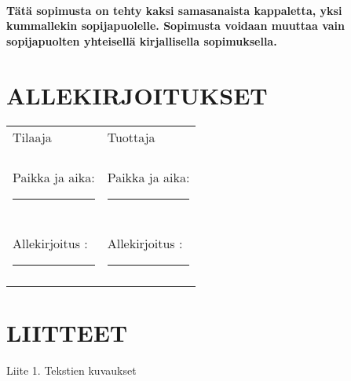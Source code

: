 \documentclass[a4paper,finnish]{article}
\begin{document}
\paragraph{Tätä sopimusta on tehty kaksi samasanaista kappaletta, yksi
kummallekin sopijapuolelle.  Sopimusta voidaan muuttaa vain
sopijapuolten yhteisellä kirjallisella sopimuksella.}
 
\section{ALLEKIRJOITUKSET}

\begin{tabular}{ll}
Tilaaja & Tuottaja \\
 & \\
Paikka ja aika: \rule{2in}{.01in} & Paikka ja aika: \rule{2in}{.01in} \\ \\
Allekirjoitus : \rule{2in}{.01in} & Allekirjoitus : \rule{2in}{.01in} \\ \\
\end{tabular}

\section{LIITTEET}
Liite 1. Tekstien kuvaukset \\
\end{document}
